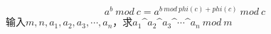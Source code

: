 $$a^b\ mod\ c=a^{b\ mod\ phi(c)+phi(c)}\ mod\ c$$
输入$m, n, a_1, a_2, a_3, \cdots, a_n$，求$a_1\^a_2\^a_3\^\cdots\^a_n\ mod\ m$
